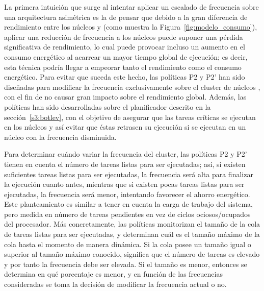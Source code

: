 La primera intuición que surge al intentar aplicar un escalado de
frecuencia sobre una arquitectura asimétrica es la de pensar que debido a
la gran diferencia de rendimiento entre los núcleos \BIG y \LITTLE (como
muestra la Figura~\ref{fig:modelo_consumo}), aplicar una reducción de
frecuencia a los núcleos \BIG puede suponer una pérdida significativa de
rendimiento, lo cual puede provocar incluso un aumento en el consumo
energético al acarrear un mayor tiempo global de ejecución; es decir, esta
técnica podría llegar a empeorar tanto el rendimiento como el consumo
energético. Para evitar que suceda este hecho, las políticas P2 y P2' han
sido diseñadas para modificar la frecuencia exclusivamente sobre el cluster
de núcleos \LITTLE, con el fin de no causar gran impacto sobre el
rendimiento global. Además, las políticas han sido desarrolladas sobre el
planificador \botlev descrito en la sección~\ref{s3:botlev}, con el
objetivo de asegurar que las tareas críticas se ejecutan en los núcleos
\BIG y así evitar que éstas retrasen su ejecución si se ejecutan en un
núcleo \LITTLE con la frecuencia disminuida.

Para determinar cuándo variar la frecuencia del cluster, las políticas P2 y
P2' tienen en cuenta el número de tareas listas para ser ejecutadas; así, si
existen suficientes tareas listas para ser ejecutadas, la frecuencia será
alta para finalizar la ejecución cuanto antes, mientras que si existen
pocas tareas listas para ser ejecutadas, la frecuencia será menor,
intentando favorecer el ahorro energético. Este planteamiento es similar a
tener en cuenta la carga de trabajo del sistema, pero medida en número de
tareas pendientes en vez de ciclos ociosos/ocupados del procesador. Más
concretamente, las políticas monitorizan el tamaño de la cola de tareas
listas para ser ejecutadas, y determinan cuál es el tamaño máximo de la
cola hasta el momento de manera dinámica. Si la cola posee un tamaño igual
o superior al tamaño máximo conocido, significa que el número de tareas es
elevado y por tanto la frecuencia debe ser elevada. Si el tamaño es menor,
entonces se determina en qué porcentaje es menor, y en función de las
frecuencias consideradas se toma la decisión de modificar la frecuencia
actual o no.

